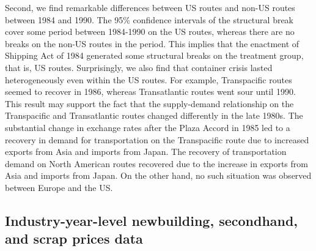 \documentclass[11pt]{article}
\begin{document}
Second, we find remarkable differences between US routes and non-US routes between 1984 and 1990. The 95\% confidence intervals of the structural break cover some period between 1984-1990 on the US routes, whereas there are no breaks on the non-US routes in the period. This implies that the enactment of Shipping Act of 1984 generated some structural breaks on the treatment group, that is, US routes. Surprisingly, we also find that container crisis lasted heterogeneously even within the US routes. For example, Transpacific routes seemed to recover in 1986, whereas Transatlantic routes went sour until 1990. This result may support the fact that the supply-demand relationship on the Transpacific and Transatlantic routes changed differently in the late 1980s. The substantial change in exchange rates after the Plaza Accord in 1985 led to a recovery in demand for transportation on the Transpacific route due to increased exports from Asia and imports from Japan. The recovery of transportation demand on North American routes recovered due to the increase in exports from Asia and imports from Japan. On the other hand, no such situation was observed between Europe and the US.





\subsection{Industry-year-level newbuilding, secondhand, and scrap prices data}
\end{document}
